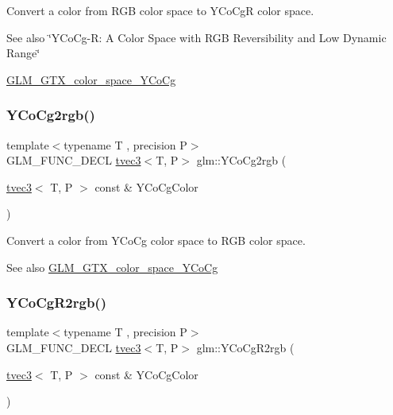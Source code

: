 Convert a color from R\+GB color space to Y\+Co\+CgR color space. \begin{DoxySeeAlso}{See also}
\char`\"{}\+Y\+Co\+Cg-\/\+R\+: A Color Space with R\+G\+B Reversibility and Low Dynamic Range\char`\"{} 

\hyperlink{group__gtx__color__space__YCoCg}{G\+L\+M\+\_\+\+G\+T\+X\+\_\+color\+\_\+space\+\_\+\+Y\+Co\+Cg} 
\end{DoxySeeAlso}
\mbox{\label{group__gtx__color__space__YCoCg_ga6d7e988a79b299ca1fa59f537e13800b}} 
\subsubsection{\texorpdfstring{Y\+Co\+Cg2rgb()}{YCoCg2rgb()}}
{\footnotesize\ttfamily template$<$typename T , precision P$>$ \\
G\+L\+M\+\_\+\+F\+U\+N\+C\+\_\+\+D\+E\+CL \hyperlink{structglm_1_1tvec3}{tvec3}$<$T, P$>$ glm\+::\+Y\+Co\+Cg2rgb (\begin{DoxyParamCaption}\item[{\hyperlink{structglm_1_1tvec3}{tvec3}$<$ T, P $>$ const \&}]{Y\+Co\+Cg\+Color }\end{DoxyParamCaption})}

Convert a color from Y\+Co\+Cg color space to R\+GB color space. \begin{DoxySeeAlso}{See also}
\hyperlink{group__gtx__color__space__YCoCg}{G\+L\+M\+\_\+\+G\+T\+X\+\_\+color\+\_\+space\+\_\+\+Y\+Co\+Cg} 
\end{DoxySeeAlso}
\mbox{\label{group__gtx__color__space__YCoCg_ga4bac5462c00df0ae89242ecdbbe5dbad}} 
\subsubsection{\texorpdfstring{Y\+Co\+Cg\+R2rgb()}{YCoCgR2rgb()}}
{\footnotesize\ttfamily template$<$typename T , precision P$>$ \\
G\+L\+M\+\_\+\+F\+U\+N\+C\+\_\+\+D\+E\+CL \hyperlink{structglm_1_1tvec3}{tvec3}$<$T, P$>$ glm\+::\+Y\+Co\+Cg\+R2rgb (\begin{DoxyParamCaption}\item[{\hyperlink{structglm_1_1tvec3}{tvec3}$<$ T, P $>$ const \&}]{Y\+Co\+Cg\+Color }\end{DoxyParamCaption})}

